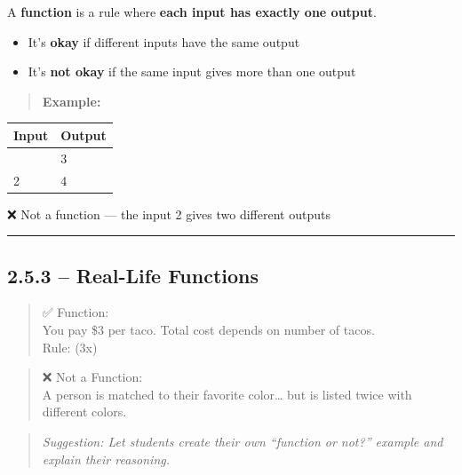 \documentclass[
  letterpaper,
  DIV=11,
  numbers=noendperiod]{scrreprt}
\providecommand{\tightlist}{%
  \setlength{\itemsep}{0pt}\setlength{\parskip}{0pt}}
\begin{document}
A \textbf{function} is a rule where \textbf{each input has exactly one
output}.

\begin{itemize}
\tightlist
\item
  It's \textbf{okay} if different inputs have the same output\\
\item
  It's \textbf{not okay} if the same input gives more than one output
\end{itemize}

\begin{quote}
\textbf{Example:}
\end{quote}

\begin{longtable}[]{@{}ll@{}}
\toprule\noalign{}
Input & Output \\
\midrule\noalign{}
\endhead
\bottomrule\noalign{}
\endlastfoot
2 & 3 \\
2 & 4 \\
\end{longtable}

❌ Not a function --- the input 2 gives two different outputs

\begin{center}\rule{0.5\linewidth}{0.5pt}\end{center}

\subsection*{2.5.3 -- Real-Life Functions}\label{real-life-functions}

\begin{quote}
✅ Function:\\
You pay \$3 per taco. Total cost depends on number of tacos.\\
Rule: (3x)
\end{quote}

\begin{quote}
❌ Not a Function:\\
A person is matched to their favorite color\ldots{} but is listed twice
with different colors.
\end{quote}

\begin{quote}
\emph{Suggestion: Let students create their own ``function or not?''
example and explain their reasoning.}
\end{quote}
\end{document}
